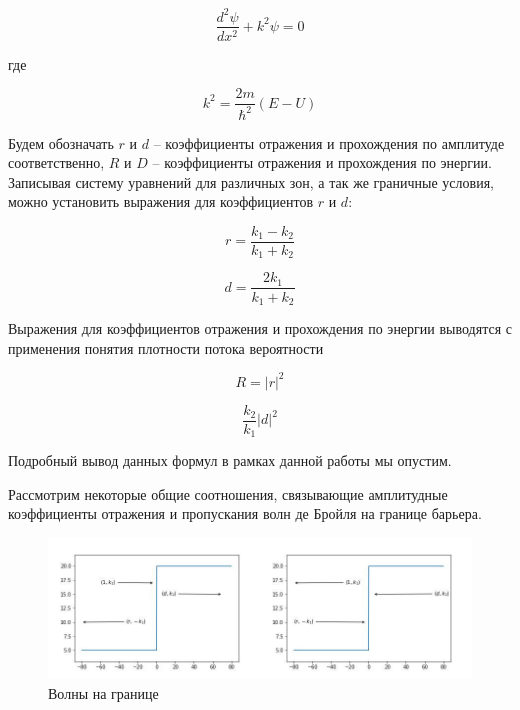 \documentclass[a4paper, 12pt]{article}
\begin{document}
    \begin{equation}
        \frac{d^2 \psi}{dx^2} + k^2 \psi = 0
    \end{equation}

    где 

    \begin{equation}
        k^2 = \frac{2m}{\hbar^2} (E - U)
    \end{equation}
    
    Будем обозначать $r$ и $d$ --
    коэффициенты отражения и прохождения по амплитуде соответственно, $R$ и $D$ -- коэффициенты отражения и прохождения
    по энергии. Записывая систему уравнений для различных зон, а так же граничные условия, можно установить выражения для
    коэффициентов $r$ и $d$:

    \begin{equation}
        r = \frac{k_1 - k_2}{k_1 + k_2}
    \end{equation}

    \begin{equation}
        d = \frac{2 k_1}{k_1 + k_2}
    \end{equation}

    Выражения для коэффициентов отражения и прохождения по энергии выводятся с применения понятия плотности потока вероятности

    \begin{equation}
        R = |r|^2
    \end{equation}

    \begin{equation}
        \frac{k_2}{k_1} |d|^2
    \end{equation}

    Подробный вывод данных формул в рамках данной работы мы опустим.

    Рассмотрим некоторые общие соотношения, связывающие амплитудные коэффициенты отражения и пропускания волн де Бройля на
    границе барьера.

    \begin{figure}
        \centering
        \includegraphics[scale=0.5]{images/StepBarrier.jpg}
        \caption{Волны на границе}
        \label{fig:StepBarrier}
    \end{figure}
\end{document}
